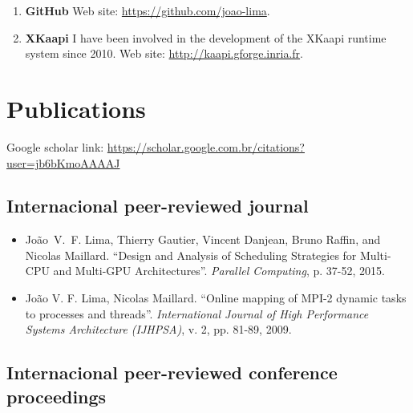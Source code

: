 \documentclass[11pt,a4paper]{article}
\begin{document}
\begin{enumerate}
\item {\bf GitHub} Web site: \url{https://github.com/joao-lima}.
\item {\bf XKaapi} I have been involved in the development of 
the XKaapi runtime system since 2010. Web site: \url{http://kaapi.gforge.inria.fr}.
\end{enumerate}

\section{Publications}

Google scholar link: {\small \url{https://scholar.google.com.br/citations?user=jb6bKmoAAAAJ}}

\subsection{Internacional peer-reviewed journal}

\begin{itemize} \itemsep -2pt
\item 
João~V.~F. Lima, Thierry Gautier, Vincent Danjean, Bruno Raffin, and Nicolas Maillard.
``Design and Analysis of Scheduling Strategies for Multi-CPU and Multi-GPU Architectures''.
\emph{Parallel Computing}, p. 37-52, 2015.


\item João V. F. Lima, Nicolas Maillard.
``Online mapping of MPI-2 dynamic tasks to processes and threads''.
\emph{International Journal of High Performance Systems Architecture (IJHPSA)}, v. 2, pp. 81-89, 2009.
\end{itemize}

\subsection{Internacional peer-reviewed conference proceedings}
\end{document}
